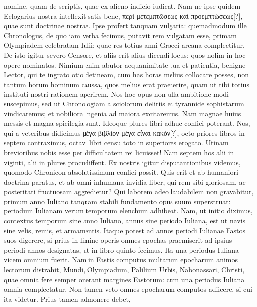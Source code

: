 nomine, quam de scriptis, quae ex alieno indicio iudicat.
Nam
ne ipse quidem Eclogarius nostra intellexit satis bene,
 \textgreek{περὶ μετεμπτῶσεως
καὶ προεμπτώσεως[?]}, quae sunt doctrinae nostrae.
Ipse profert tanquam vulgaria: quemadmodum ille Chronologus, de quo iam
verba fecimus, putavit rem vulgatam esse, primam Olympiadem
celebratam  Iulii:
 quae res totius anni Graeci arcana complectitur.
De isto igitur severo Censore, et aliis erit alius dicendi locus:
quos nolim in hoc opere nominatos.
Nimium enim abutor aequanimitate
tua et patientia, benigne Lector, qui te ingrato otio detineam,
cum has horas melius collocare posses, non tantum horum
hominum caussa, quos melius erat praeterire, quam ut tibi totius instituti
nostri rationem aperirem.
%
Nos hoc opus non ulla ambitione
modi suscepimus, sed ut Chronologiam a sciolorum deliriis et tyrannide
sophistarum vindicaremus; et nobiliora ingenia ad maiora excitaremus.
Nam magnae huius messis et magna spicilegia sunt.
Ideoque
plures libri adhuc confici poterant.
Nos, qui a veteribus didicimus
\textgreek{μέγα βιβλίον μέγα εἶναι κακὸν[?]},
 octo priores libros in septem contraximus,
octavi libri censu toto in superiores erogato.
Utinam brevioribus nobis esse per difficultatem rei licuisset!
Nam septem hos alii
in viginti, alii in plures procudiffent.
Ex nostris igitur disputantionibus
videmus, quomodo Chronicon absolutissimum confici possit.
Quis
erit et ab humaniori doctrina paratus, et ab omni inhumana invidia
liber, qui rem sibi gloriosam, ac posteritati fructuosam aggredietur?
Qui laborem adeo laudabilem non gravabitur, primum anno Iuliano
tanquam stabili fundamento opus suum superstruat: periodum Iulianam
verum temporum elenchum adhibeat.
Nam, ut initio diximus,
contextus temporum sine anno Iuliano, annus sine periodo Iuliana,
est ut navis sine velis, remis, et armamentis.
Itaque potest ad
annos periodi Iulianae Fastos suos digerere, si prius in limine operis
omnes epochas praemiserit ad ipsius periodi annos designatas, ut in
libro quinto fecimus.
Ita una periodus Iuliana vicem omnium fuerit.
Nam in Fastis computus multarum epocharum animos lectorum distrahit,
Mundi, Olympiadum, Palilium Urbis, Nabonassari, Christi,
quae omnia fere semper onerant margines Fastorum: cum una periodus
Iuliana omnia complectatur.
Non tamen veto omnes epocharum
computos adiicere, si cui ita videtur.
Prius tamen admonere debet,
